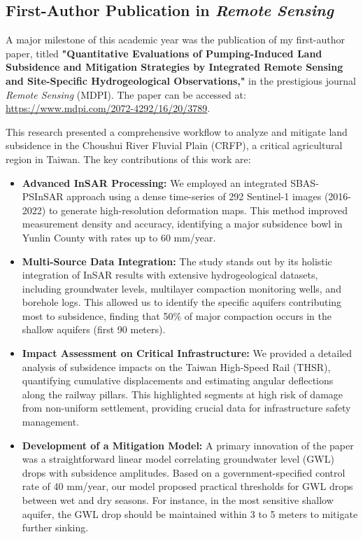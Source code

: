 \documentclass[12pt, a4paper]{article}
\begin{document}
	\subsection{First-Author Publication in \textit{Remote Sensing}}
	
	A major milestone of this academic year was the publication of my first-author paper, titled \textbf{"Quantitative Evaluations of Pumping-Induced Land Subsidence and Mitigation Strategies by Integrated Remote Sensing and Site-Specific Hydrogeological Observations,"} in the prestigious journal \textit{Remote Sensing} (MDPI). The paper can be accessed at: \href{https://www.mdpi.com/2072-4292/16/20/3789}{https://www.mdpi.com/2072-4292/16/20/3789}.
	
	This research presented a comprehensive workflow to analyze and mitigate land subsidence in the Choushui River Fluvial Plain (CRFP), a critical agricultural region in Taiwan. The key contributions of this work are:
	
	\begin{itemize}
		\item \textbf{Advanced InSAR Processing:} We employed an integrated SBAS-PSInSAR approach using a dense time-series of 292 Sentinel-1 images (2016-2022) to generate high-resolution deformation maps. This method improved measurement density and accuracy, identifying a major subsidence bowl in Yunlin County with rates up to 60 mm/year.
		\item \textbf{Multi-Source Data Integration:} The study stands out by its holistic integration of InSAR results with extensive hydrogeological datasets, including groundwater levels, multilayer compaction monitoring wells, and borehole logs. This allowed us to identify the specific aquifers contributing most to subsidence, finding that 50\% of major compaction occurs in the shallow aquifers (first 90 meters).
		\item \textbf{Impact Assessment on Critical Infrastructure:} We provided a detailed analysis of subsidence impacts on the Taiwan High-Speed Rail (THSR), quantifying cumulative displacements and estimating angular deflections along the railway pillars. This highlighted segments at high risk of damage from non-uniform settlement, providing crucial data for infrastructure safety management.
		\item \textbf{Development of a Mitigation Model:} A primary innovation of the paper was a straightforward linear model correlating groundwater level (GWL) drops with subsidence amplitudes. Based on a government-specified control rate of 40 mm/year, our model proposed practical thresholds for GWL drops between wet and dry seasons. For instance, in the most sensitive shallow aquifer, the GWL drop should be maintained within 3 to 5 meters to mitigate further sinking.
	\end{itemize}
	
\end{document}
